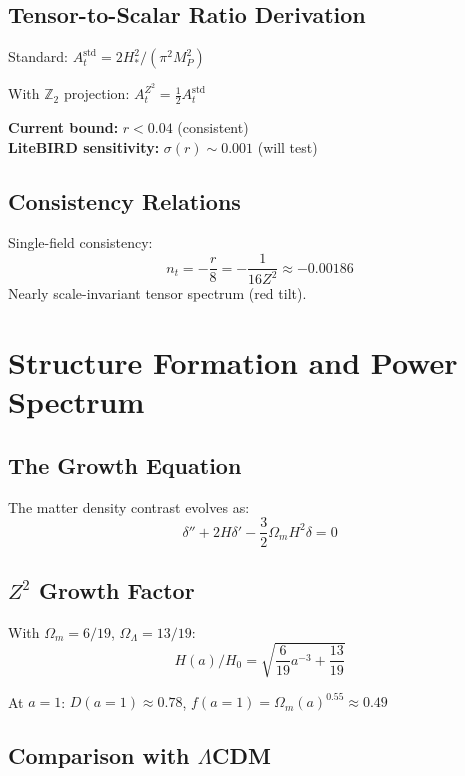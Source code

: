\documentclass[11pt,a4paper]{article}
\theoremstyle{plain}
\theoremstyle{definition}
\theoremstyle{remark}
\newcommand{\Omegam}{\Omega_m}
\newcommand{\OmegaL}{\Omega_\Lambda}
\newcommand{\Ztwo}{\mathbb{Z}_2}
\begin{document}
\subsection{Tensor-to-Scalar Ratio Derivation}

Standard: $A_t^{\text{std}} = 2H_*^2/(\pi^2 M_P^2)$

With $\Ztwo$ projection: $A_t^{Z^2} = \frac{1}{2} A_t^{\text{std}}$

\begin{center}
\end{center}

\textbf{Current bound:} $r < 0.04$ (consistent) \\
\textbf{LiteBIRD sensitivity:} $\sigma(r) \sim 0.001$ (will test)

\subsection{Consistency Relations}

Single-field consistency:
\[
n_t = -\frac{r}{8} = -\frac{1}{16Z^2} \approx -0.00186
\]
Nearly scale-invariant tensor spectrum (red tilt).

\section{Structure Formation and Power Spectrum}

\subsection{The Growth Equation}

The matter density contrast evolves as:
\[
\delta'' + 2H\delta' - \frac{3}{2}\Omegam H^2 \delta = 0
\]

\subsection{$Z^2$ Growth Factor}

With $\Omegam = 6/19$, $\OmegaL = 13/19$:
\[
H(a)/H_0 = \sqrt{\frac{6}{19}a^{-3} + \frac{13}{19}}
\]

At $a = 1$: $D(a=1) \approx 0.78$, $f(a=1) = \Omegam(a)^{0.55} \approx 0.49$

\subsection{Comparison with $\Lambda$CDM}
\end{document}
